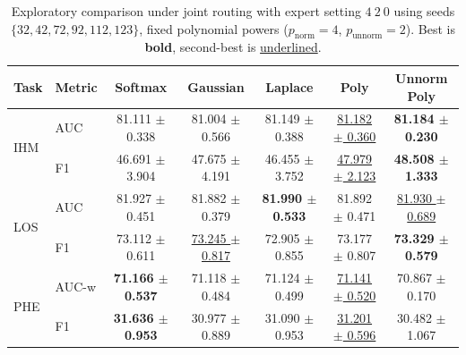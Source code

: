 \begin{table}[h]
\centering
\small
\setlength{\tabcolsep}{4pt}
\begin{tabular}{llccccc}
\toprule
Task & Metric & Softmax & Gaussian & Laplace & Poly & Unnorm Poly \\
\midrule
\multirow{2}{*}{IHM} & AUC & 81.111 $\pm$ 0.338 & 81.004 $\pm$ 0.566 & 81.149 $\pm$ 0.388 & \underline{81.182 $\pm$ 0.360} & \textbf{81.184 $\pm$ 0.230} \\
 & F1 & 46.691 $\pm$ 3.904 & 47.675 $\pm$ 4.191 & 46.455 $\pm$ 3.752 & \underline{47.979 $\pm$ 2.123} & \textbf{48.508 $\pm$ 1.333} \\
\midrule
\multirow{2}{*}{LOS} & AUC & 81.927 $\pm$ 0.451 & 81.882 $\pm$ 0.379 & \textbf{81.990 $\pm$ 0.533} & 81.892 $\pm$ 0.471 & \underline{81.930 $\pm$ 0.689} \\
 & F1 & 73.112 $\pm$ 0.611 & \underline{73.245 $\pm$ 0.817} & 72.905 $\pm$ 0.855 & 73.177 $\pm$ 0.807 & \textbf{73.329 $\pm$ 0.579} \\
\midrule
\multirow{2}{*}{PHE} & AUC-w & \textbf{71.166 $\pm$ 0.537} & 71.118 $\pm$ 0.484 & 71.124 $\pm$ 0.499 & \underline{71.141 $\pm$ 0.520} & 70.867 $\pm$ 0.170 \\
 & F1 & \textbf{31.636 $\pm$ 0.953} & 30.977 $\pm$ 0.889 & 31.090 $\pm$ 0.953 & \underline{31.201 $\pm$ 0.596} & 30.482 $\pm$ 1.067 \\
\bottomrule
\end{tabular}
\caption{Exploratory comparison under joint routing with expert setting $4\ 2\ 0$ using seeds $\{32,42,72,92,112,123\}$, fixed polynomial powers ($p_\text{norm}=4$, $p_\text{unnorm}=2$). Best is \textbf{bold}, second-best is \underline{underlined}.}
\label{tab:explore_compromise_constp4p2_6seed_32427292112123_joint420_gating_table}
\end{table}
